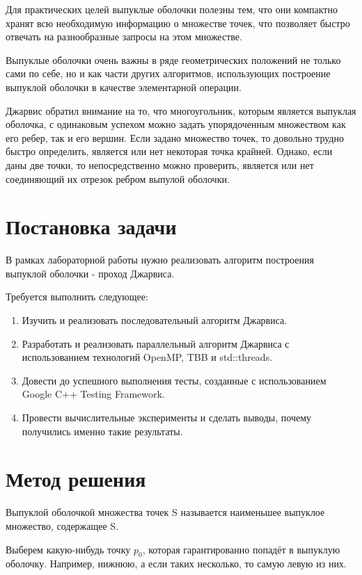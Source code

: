 \documentclass{report}
\begin{document}
\par Для практических целей выпуклые оболочки полезны тем, что они компактно хранят всю необходимую информацию о множестве точек, что позволяет быстро отвечать на разнообразные запросы на этом множестве.

\par Выпуклые оболочки очень важны в ряде геометрических положений не только сами по себе, но и как части других алгоритмов, использующих построение выпуклой оболочки в качестве элементарной операции.

\par Джарвис обратил внимание на то, что многоугольник, которым является выпуклая оболочка, с одинаковым успехом можно задать упорядоченным множеством как его ребер, так и его вершин. Если задано множество точек, то довольно трудно быстро определить, является или нет некоторая точка крайней. Однако, если даны две точки, то непосредственно можно проверить, является или нет соединяющий их отрезок ребром выпулой оболочки.

\newpage

\section{Постановка задачи}
В рамках лабораторной работы нужно реализовать алгоритм построения выпуклой оболочки - проход Джарвиса.
\par Требуется выполнить следующее:
\begin{enumerate}
\item Изучить и реализовать последовательный алгоритм Джарвиса.
\item Разработать и реализовать параллельный алгоритм Джарвиса с использованием технологий OpenMP, TBB и std::threads.
\item Довести до успешного выполнения тесты, созданные с использованием Google C++ Testing Framework.
\item Провести вычислительные эксперименты и сделать выводы, почему получились именно такие результаты.
\end{enumerate}

\newpage

\section{Метод решения}
Выпуклой оболочкой множества точек S называется наименьшее
выпуклое множество, содержащее S.

\par Выберем какую-нибудь точку $p_{0}$, которая гарантированно попадёт в выпуклую оболочку. Например, нижнюю, а если таких несколько, то самую левую из них.
\end{document}
